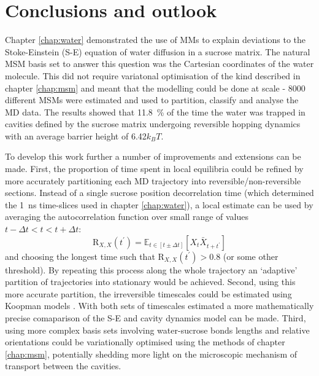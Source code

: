 \let\textcircled=\pgftextcircled
\chapter{Conclusions and outlook}
\label{chap:conclusions}



Chapter \ref{chap:water} demonstrated the use of MMs to explain deviations to the Stoke-Einstein (S-E) equation of water diffusion in a sucrose matrix. The natural MSM basis set to answer this question was the Cartesian coordinates of the water molecule. This did not require variatonal optimisation of the kind described in chapter \ref{chap:msm} and meant that the modelling could be done at scale - 8000 different MSMs were estimated and used to partition, classify and analyse the MD data. The results showed that \SI{11.8}{\percent} of the time the water was trapped in cavities defined by the sucrose matrix undergoing reversible hopping dynamics with an average barrier height of \num{6.42}$k_{B}T$. 

To develop this work further a number of improvements and extensions can be made. First, the proportion of time spent in local equilibria could be refined by more accurately partitioning each MD trajectory into reversible/non-reversible sections. Instead of a single sucrose position decorrelation time (which determined the \SI{1}{\nano\second} time-slices used in chapter \ref{chap:water}), a local estimate can be used by averaging the autocorrelation function over small range of values $t-\Delta t < t < t+\Delta t$:
\begin{equation}
\mathrm{R}_{X,  X}(t^{\prime})=\mathbb{E}_{t \in [t\pm\Delta t]}\left[X_{t} \bar{X}_{t+t^{\prime}}\right]
\end{equation}
and choosing the longest time such that $\mathrm{R}_{X,  X}(t^{\prime}) > 0.8$ (or some other threshold). By repeating this process along the whole trajectory an `adaptive' partition of trajectories into stationary would be achieved. Second, using this more accurate partition, the irreversible timescales could be estimated using Koopman models \cite{wuVariationalKoopmanModels2017}. With both sets of timescales estimated a more mathematically precise comaparison of the S-E and cavity dynamics model can be made. Third, using more complex basis sets involving water-sucrose bonds lengths and relative orientations could be  variationally  optimised using the methods of chapter \ref{chap:msm}, potentially shedding more light on the microscopic mechanism of transport between the cavities. 

